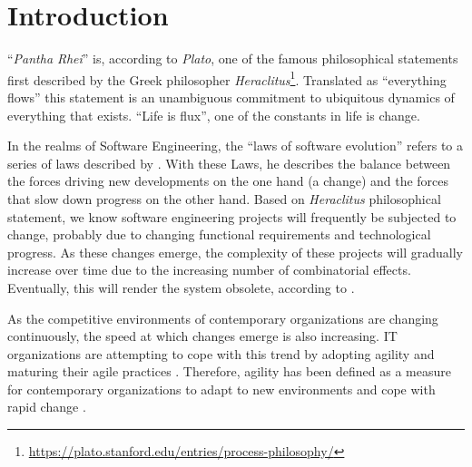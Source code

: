 \chapter{Introduction} \label{introduction}

\enquote{\emph{Pantha Rhei}} is, according to \emph{Plato}, one of the famous
philosophical statements first described by the Greek philosopher
\emph{Heraclitus}\footnote{\url{https://plato.stanford.edu/entries/process-philosophy/}}.
Translated as \enquote{everything flows} this statement is an unambiguous commitment to
ubiquitous dynamics of everything that exists. \enquote{Life is flux}, one of the
constants in life is change.

In the realms of Software Engineering, the \enquote{laws of software evolution}
\parencite[]{lehman_programs_1980} refers to a series of laws described by
\citeauthor{lehman_programs_1980}. With these Laws, he describes the balance between the
forces driving new developments on the one hand (a change) and the forces that slow down
progress on the other hand. Based on \emph{Heraclitus} philosophical statement, we know
software engineering projects will frequently be subjected to change, probably due to
changing functional requirements and technological progress. As these changes emerge, the
complexity of these projects will gradually increase over time due to the increasing
number of combinatorial effects. Eventually, this will render the system obsolete,
according to \citeauthor{lehman_programs_1980} \parencite[]{lehman_programs_1980}.

As the competitive environments of contemporary organizations are changing continuously,
the speed at which changes emerge is also increasing. IT organizations are
attempting to cope with this trend by adopting agility and maturing their agile practices
\parencite[]{2024_SIM_key_issues_and_trends}. Therefore, agility has been defined as a measure for
contemporary organizations to adapt to new environments and cope with rapid change
\parencite[]{neumann_strategic_1994}.


